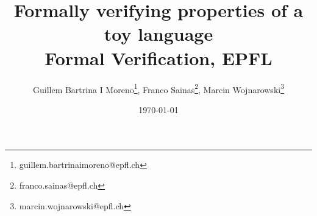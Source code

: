 \documentclass[notitlepage]{article}
\title{Formally verifying properties of a toy language\\\large Formal Verification, EPFL}
\author{
	Guillem Bartrina I Moreno\thanks{guillem.bartrinaimoreno@epfl.ch},
	Franco Sainas\thanks{franco.sainas@epfl.ch},
	Marcin Wojnarowski\thanks{marcin.wojnarowski@epfl.ch}
}
\date{\today}
\begin{document}
\maketitle

\begin{abstract}
	\lipsum[1] \cite{blackshear2022borrow}
\end{abstract}

\printbibliography
\end{document}
